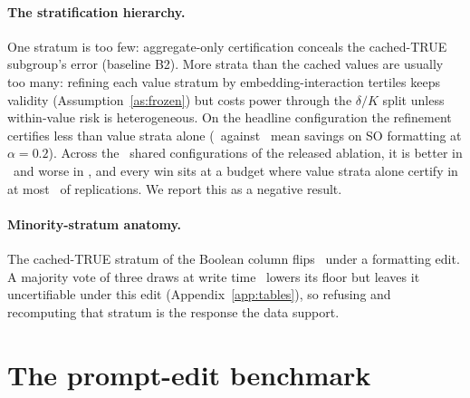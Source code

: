 \keeprunin
\paragraph{The stratification hierarchy.} One stratum is too few:
aggregate-only certification conceals the cached-TRUE subgroup's error
(baseline B2). More strata than the cached values are usually too many:
refining each value stratum by embedding-interaction tertiles keeps
validity (Assumption~\ref{as:frozen}) but costs power through the
$\delta/K$ split unless within-value risk is heterogeneous. On the
headline configuration the refinement certifies less than value strata
alone (\ablationSavings\ against \benchSavings\ mean savings on SO
formatting at $\alpha{=}0.2$). Across the \ablationTotal\ shared
configurations of the released ablation, it is better in
\ablationBetter\ and worse in \ablationWorse, and every win sits at a
budget where value strata alone certify in at most
\ablationWinBaseCertMax\ of replications. We report this as a negative
result.

\keeprunin
\paragraph{Minority-stratum anatomy.} The cached-TRUE stratum of the
Boolean column flips \minoritySingle\ under a formatting edit. A
majority vote of three draws at write time~\cite{selfconsistency}
lowers its floor but leaves it uncertifiable under this edit
(Appendix~\ref{app:tables}), so refusing and recomputing that stratum is
the response the data support.

\keepheading
\section{The prompt-edit benchmark}
\label{sec:benchmark}

